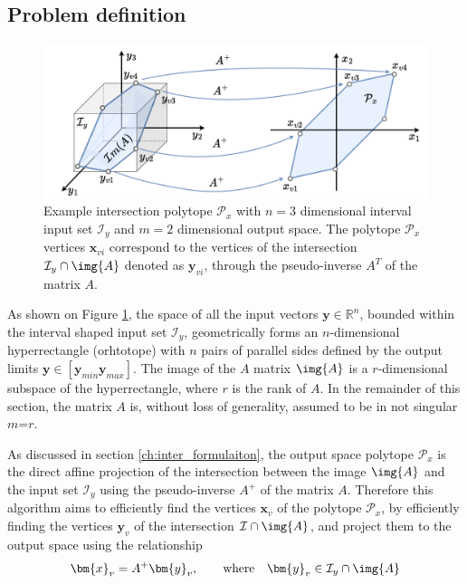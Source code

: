 \subsection{Problem definition}

\begin{figure}[!h]
    \centering
    \includegraphics[width=0.8\linewidth]{Papers/images/intersection_algo.pdf}
    \caption{Example intersection polytope $\mathcal{P}_x$ with $n=3$ dimensional interval input set $\mathcal{I}_y$ and $m=2$ dimensional output space. The polytope $\mathcal{P}_x$ vertices $\bm{x}_{vi}$ correspond to the vertices of the intersection $\mathcal{I}_y\cap\img{A}$ denoted as $\bm{y}_{vi}$, through the pseudo-inverse $A^T$ of the matrix $A$.}
    \label{fig:intersection_algo}
\end{figure}

As shown on Figure \ref{fig:intersection_algo}, the space of all the input vectors $\bm{y}\in\mathbb{R}^n$, bounded within the interval shaped input set $\mathcal{I}_y$, geometrically forms an $n$-dimensional hyperrectangle (orhtotope) with $n$ pairs of parallel sides defined by the output limits $\bm{y}\in[\bm{y}_{min}\bm{y}_{max}]$. The image of the $A$ matrix $\img{A}$ is a $r$-dimensional subspace of the hyperrectangle, where $r$ is the rank of $A$. In  the remainder of this section, the matrix $A$ is, without loss of generality, assumed to be in not singular $m$=$r$. 

As discussed in section \ref{ch:inter_formulaiton}, the output space polytope $\mathcal{P}_x$ is the direct affine projection of the intersection between the image $\img{A}$ and the input set $\mathcal{I}_y$ using the pseudo-inverse $A^+$ of the matrix $A$. Therefore this algorithm aims to efficiently find the vertices $\bm{x}_{v}$ of the polytope $\mathcal{P}_x$, by efficiently finding the vertices $\bm{y}_{v}$ of the intersection $\mathcal{I}\cap \img{A}$, and project them to the output space using the relationship
\begin{equation}
    \bm{x}_v = A^{+}\bm{y}_v, \qquad \text{where} \quad \bm{y}_v\in\mathcal{I}_y\cap \img{A} \label{eq:compute_vert}
\end{equation}

